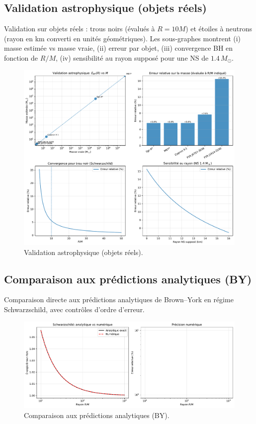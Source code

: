 \documentclass[11pt,a4paper]{article}
\begin{document}
\medskip

\subsection*{Validation astrophysique (objets réels)}
Validation sur objets réels : trous noirs (évalués à $R=10M$) et étoiles à neutrons (rayon en km converti en unités géométriques). Les sous-graphes montrent (i) masse estimée vs masse vraie, (ii) erreur par objet, (iii) convergence BH en fonction de $R/M$, (iv) sensibilité au rayon supposé pour une NS de $1.4\,M_\odot$.

\begin{figure}[htbp]
  \centering
  \includegraphics[width=\linewidth]{fig_astrophysical_validation.pdf}
  \caption{Validation astrophysique (objets réels).}
  \label{fig:fig_astrophysical_validation}
\end{figure}

\medskip

\subsection*{Comparaison aux prédictions analytiques (BY)}
Comparaison directe aux prédictions analytiques de Brown–York en régime Schwarzschild, avec contrôles d’ordre d’erreur.

\begin{figure}[htbp]
  \centering
  \includegraphics[width=\linewidth]{fig_theoretical_comparison.pdf}
  \caption{Comparaison aux prédictions analytiques (BY).}
  \label{fig:fig_theoretical_comparison}
\end{figure}
\end{document}
